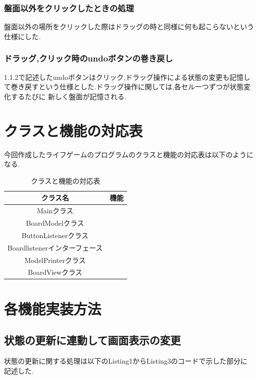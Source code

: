 \documentclass[dvipdfmx]{jarticle}
\begin{document}
\subsubsection{盤面以外をクリックしたときの処理}
盤面以外の場所をクリックした際はドラッグの時と同様に何も起こらないという仕様にした.
\subsubsection{ドラッグ,クリック時のundoボタンの巻き戻し}
1.1.2で記述したundoボタンはクリック,ドラッグ操作による状態の変更も記憶して巻き戻すという仕様とした.ドラッグ操作に関しては,各セル一つずつが状態変化するたびに
新しく盤面が記憶される.

\section{クラスと機能の対応表}
今回作成したライフゲームのプログラムのクラスと機能の対応表は以下のようになる.
\begin{table}[h]
  \centering
  \begin{tabular}{|c|c|}
    \hline
    クラス名&機能\\\hline\hline
    Mainクラス&\\\hline
    BoardModelクラス&\\\hline
    ButtonListenerクラス&\\\hline
    Boardlistenerインターフェース&\\\hline
    ModelPrinterクラス&\\\hline
    BoardViewクラス&\\\hline
  \end{tabular}
  \caption{クラスと機能の対応表}
\end{table}


\section{各機能実装方法}

\subsection{状態の更新に連動して画面表示の変更}
状態の更新に関する処理は以下のListing1からListing3のコードで示した部分に記述した.
\end{document}

